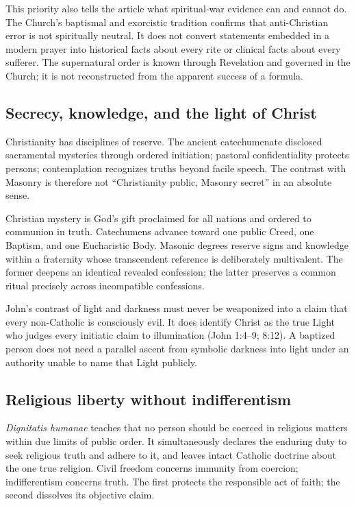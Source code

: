 This priority also tells the article what spiritual-war evidence can and cannot do. The Church's baptismal and exorcistic tradition confirms that anti-Christian error is not spiritually neutral. It does not convert statements embedded in a modern prayer into historical facts about every rite or clinical facts about every sufferer. The supernatural order is known through Revelation and governed in the Church; it is not reconstructed from the apparent success of a formula.

\subsection{Secrecy, knowledge, and the light of Christ}

Christianity has disciplines of reserve. The ancient catechumenate disclosed sacramental mysteries through ordered initiation; pastoral confidentiality protects persons; contemplation recognizes truths beyond facile speech. The contrast with Masonry is therefore not “Christianity public, Masonry secret” in an absolute sense.

Christian mystery is God's gift proclaimed for all nations and ordered to communion in truth. Catechumens advance toward one public Creed, one Baptism, and one Eucharistic Body. Masonic degrees reserve signs and knowledge within a fraternity whose transcendent reference is deliberately multivalent. The former deepens an identical revealed confession; the latter preserves a common ritual precisely across incompatible confessions.

John's contrast of light and darkness must never be weaponized into a claim that every non-Catholic is consciously evil. It does identify Christ as the true Light who judges every initiatic claim to illumination (John 1:4--9; 8:12). A baptized person does not need a parallel ascent from symbolic darkness into light under an authority unable to name that Light publicly.

\subsection{Religious liberty without indifferentism}

\emph{Dignitatis humanae} teaches that no person should be coerced in religious matters within due limits of public order. It simultaneously declares the enduring duty to seek religious truth and adhere to it, and leaves intact Catholic doctrine about the one true religion. Civil freedom concerns immunity from coercion; indifferentism concerns truth. The first protects the responsible act of faith; the second dissolves its objective claim.

